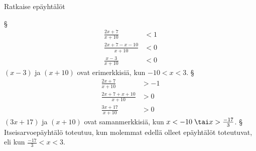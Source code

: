 \begin{esimerkki}
	Ratkaise epäyhtälöt
	\begin{esimratk}
		\begin{alakohdat}
			§
				\begin{align*}
					\frac{2x+7}{x+10} &< 1 \\
					\frac{2x+7-x-10}{x+10} &< 0 \\
					\frac{x-3}{x+10} &< 0
				\end{align*}
				$(x-3)$ ja $(x+10)$ ovat erimerkkisiä, kun $-10 < x < 3$.
			§
				\begin{align*}
					\frac{2x+7}{x+10} &> -1 \\
					\frac{2x+7+x+10}{x+10} &> 0 \\
					\frac{3x+17}{x+10} &> 0
				\end{align*}
				$(3x+17)$ ja $(x+10)$ ovat samanmerkkisiä, kun $x < -10 \;\tai x > \frac{-17}3$.
			§
				Itseisarvoepäyhtälö toteutuu, kun molemmat edellä olleet epäyhtälöt toteutuvat,
				eli kun $\frac{-17}{3} < x < 3$.
		\end{alakohdat}
	\end{esimratk}
	\begin{esimvast}
	\end{esimvast}
\end{esimerkki}
